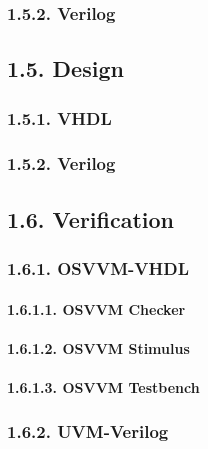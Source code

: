 \documentclass[
]{article}
\begin{document}
\hypertarget{verilog-1}{%
\subsubsection{1.5.2. Verilog}\label{verilog-1}}

\hypertarget{design}{%
\subsection{1.5. Design}\label{design}}

\hypertarget{vhdl-2}{%
\subsubsection{1.5.1. VHDL}\label{vhdl-2}}

\hypertarget{verilog-2}{%
\subsubsection{1.5.2. Verilog}\label{verilog-2}}

\hypertarget{verification}{%
\subsection{1.6. Verification}\label{verification}}

\hypertarget{osvvm-vhdl}{%
\subsubsection{1.6.1. OSVVM-VHDL}\label{osvvm-vhdl}}

\hypertarget{osvvm-checker}{%
\paragraph{1.6.1.1. OSVVM Checker}\label{osvvm-checker}}

\hypertarget{osvvm-stimulus}{%
\paragraph{1.6.1.2. OSVVM Stimulus}\label{osvvm-stimulus}}

\hypertarget{osvvm-testbench}{%
\paragraph{1.6.1.3. OSVVM Testbench}\label{osvvm-testbench}}

\hypertarget{uvm-verilog}{%
\subsubsection{1.6.2. UVM-Verilog}\label{uvm-verilog}}
\end{document}

